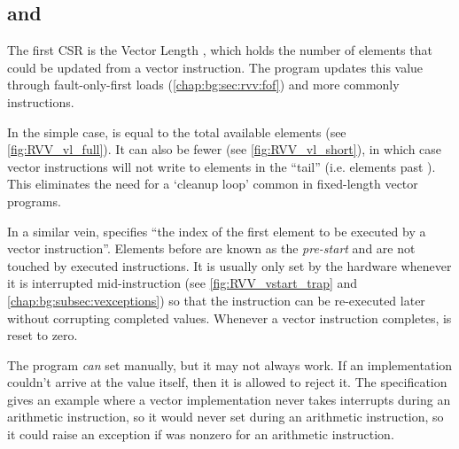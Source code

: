 \subsection{ and }\label{chap:bg:subsec:vlvstart}
The first CSR is the Vector Length , which holds the number of elements that could be updated from a vector instruction.
The program updates this value through fault-only-first loads (\cref{chap:bg:sec:rvv:fof}) and more commonly  instructions.

In the simple case,  is equal to the total available elements (see \cref{fig:RVV_vl_full}).
It can also be fewer (see \cref{fig:RVV_vl_short}), in which case vector instructions will not write to elements in the \enquote{tail} (i.e. elements past ).
This eliminates the need for a `cleanup loop' common in fixed-length vector programs.


In a similar vein,  specifies \enquote{the index of the first element to be executed by a vector instruction}.
Elements before  are known as the \emph{pre-start} and are not touched by executed instructions.
It is usually only set by the hardware whenever it is interrupted mid-instruction (see \cref{fig:RVV_vstart_trap} and \cref{chap:bg:subsec:vexceptions}) so that the instruction can be re-executed later without corrupting completed values.
Whenever a vector instruction completes,  is reset to zero.

The program \emph{can} set  manually, but it may not always work.
If an implementation couldn't arrive at the value itself, then it is allowed to reject it.
The specification gives an example where a vector implementation never takes interrupts during an arithmetic instruction, so it would never set  during an arithmetic instruction, so it could raise an exception if  was nonzero for an arithmetic instruction.


